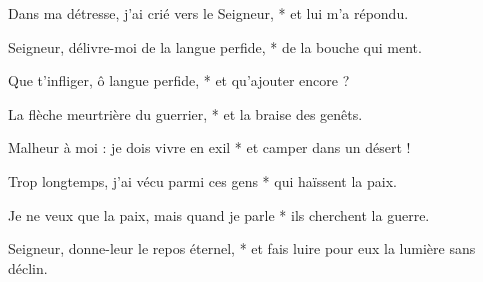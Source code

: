 \item Dans ma détresse, j'ai crié vers le Seigneur, * et lui m'a répondu.

\item Seigneur, délivre-moi de la langue perfide, * de la bouche qui ment.

\item Que t'infliger, ô langue perfide, * et qu'ajouter encore ?

\item La flèche meurtrière du guerrier, * et la braise des genêts.

\item Malheur à moi : je dois vivre en exil * et camper dans un désert !

\item Trop longtemps, j'ai vécu parmi ces gens * qui haïssent la paix.

\item Je ne veux que la paix, mais quand je parle * ils cherchent la guerre.

\item Seigneur, donne-leur le repos éternel, * et fais luire pour eux la lumière sans déclin.